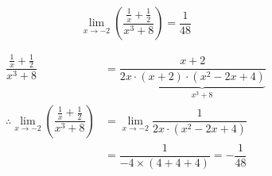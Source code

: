 \documentclass[14pt,fleqn]{extarticle}
\begin{document}
 

\[ \lim_{x\to -2}\left(\dfrac{\frac{1}{x} + \frac{1}{2}}{x^3 + 8}\right) = \dfrac{1}{48}  \]

\newcard 

\begin{align}
\dfrac{\frac{1}{x} + \frac{1}{2}}{x^3 + 8} &= \dfrac{x+2}{2x\cdot\underbrace{(x+2)\cdot(x^2-2x+4)}_{x^3 + 8}}\\
\therefore  \lim_{x\to -2}\left(\dfrac{\frac{1}{x} + \frac{1}{2}}{x^3 + 8}\right) &= 
\lim_{x\to -2}\dfrac{1}{2x\cdot (x^2-2x+4)} \\
&= \dfrac{1}{-4\times (4 + 4 + 4)} = -\dfrac{1}{48} 
\end{align}
\end{document}

